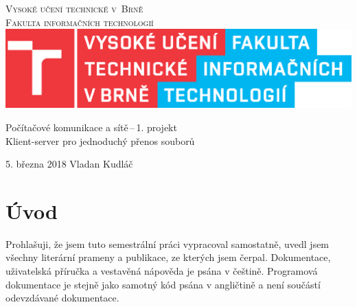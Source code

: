 \documentclass[11pt,a4paper]{article}
\author{Vladan Kudláč}
\begin{document}
\begin{titlepage}
\begin{center}
	\textsc{
		{\Huge Vysoké učení technické v~Brně} \\
		\medskip
		{\huge Fakulta informačních technologií} \\
	}
	\includegraphics{logoFIT.eps}
	
	{\LARGE Počítačové komunikace a sítě\,--\,1. projekt} \\
	\medskip
	{\Huge Klient-server pro jednoduchý přenos souborů}
	
	{\Large 5. března 2018 \hfill Vladan Kudláč}
\end{center}
\end{titlepage}

\tableofcontents
\pagebreak

\section{Úvod}
Prohlašuji, že jsem tuto semestrální práci vypracoval samostatně, uvedl jsem všechny literární prameny a publikace, ze kterých jsem čerpal.
Dokumentace, uživatelská příručka a vestavěná nápověda je psána v češtině. Programová dokumentace je stejně jako samotný kód psána v angličtině a není součástí odevzdávané dokumentace.
\end{document}
